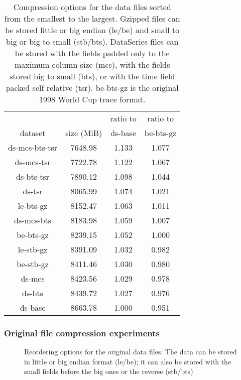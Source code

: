 \begin{table}
\centering
\begin{tabular}{|c|c|c|c|}\hline

               &            & ratio to & ratio to  \\
    dataset    & size (MiB) & ds-base  & be-bts-gz \\
\hline							   
ds-mcs-bts-tsr & 7648.98    & 1.133    & 1.077     \\
ds-mcs-tsr     & 7722.78    & 1.122    & 1.067     \\
ds-bts-tsr     & 7890.12    & 1.098    & 1.044     \\
ds-tsr         & 8065.99    & 1.074    & 1.021     \\
le-bts-gz      & 8152.47    & 1.063    & 1.011     \\
ds-mcs-bts     & 8183.98    & 1.059    & 1.007     \\
be-bts-gz      & 8239.15    & 1.052    & 1.000     \\
le-stb-gz      & 8391.09    & 1.032    & 0.982     \\
be-stb-gz      & 8411.46    & 1.030    & 0.980     \\
ds-mcs         & 8423.56    & 1.029    & 0.978     \\
ds-bts         & 8439.72    & 1.027    & 0.976     \\
ds-base        & 8663.78    & 1.000    & 0.951     \\
\hline
\end{tabular}


\caption{Compression options for the data files sorted from the smallest 
to the largest.  Gzipped files can be stored little or big endian
(le/be) and small to big or big to small (stb/bts).  DataSeries files
can be stored with the fields padded only to the maximum column size
(mcs), with the fields stored big to small (bts), or with the time
field packed self relative (tsr). be-bts-gz is the original 1998 World
Cup trace format.}

\label{table:wc1998:compression}
\end{table}

\subsubsection{Original file compression experiments}

\begin{figure}
\caption{Reordering options for the original data files.  
The data can be stored in little or big endian format (le/be); it can
also be stored with the small fields before the big ones or the
reverse (stb/bts)}
\label{fig:wc1998:original-data-reordering}
\end{figure}

